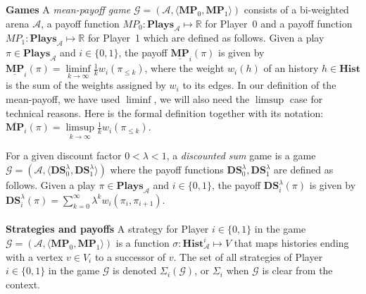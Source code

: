 \noindent\textbf{Games} A \textit{mean-payoff game} $\mathcal{G} = (\mathcal{A},\langle \mathbf{MP}_0, \mathbf{MP}_1\rangle)$ consists of a bi-weighted arena $\mathcal{A}$, a payoff function $MP_0 : \mathbf{Plays}_{\mathcal{A}} \mapsto \mathbb{R}$ for Player~0 and a payoff function $MP_1 : \mathbf{Plays}_{\mathcal{A}} \mapsto \mathbb{R}$ for Player~1 which are defined as follows. Given a play $\pi \in \mathbf{Plays}_{\mathcal{A}}$ and $i \in \{0,1\}$, the payoff $\underline{\mathbf{MP}}_i(\pi)$ is given by $\underline{\mathbf{MP}}_i(\pi) = \liminf\limits_{k \to \infty} \frac{1}{k}w_i(\pi_{\leqslant k}) $, where the weight $w_i(h)$ of an history $h \in \mathbf{Hist}$ is the sum of the weights assigned by $w_i$ to its edges. In our definition of the mean-payoff, we have used $\liminf$, we will also need the $\limsup$ case for technical reasons. Here is the formal definition together with its notation: $\overline{\mathbf{MP}}_i(\pi) = \limsup\limits_{k \to \infty} \frac{1}{k}w_i(\pi_{\leqslant k}) $.

For a given discount factor $0 < \lambda < 1$, a \textit{discounted sum} game is a game $\mathcal{G} = (\mathcal{A},\langle \mathbf{DS}^{\lambda}_0, \mathbf{DS}^{\lambda}_1\rangle)$ where the payoff functions $\mathbf{DS}^{\lambda}_0, \mathbf{DS}^{\lambda}_1$ are defined as follows. Given a play $\pi \in \mathbf{Plays}_{\mathcal{A}}$ and $i \in \{0,1\}$, the payoff $\mathbf{DS}^{\lambda}_i(\pi)$ is given by $\mathbf{DS}^{\lambda}_i(\pi) = \sum^{\infty}_{k=0}\lambda^k w_i(\pi_i, \pi_{i+1})$.
\\
\\
\textbf{Strategies and payoffs} A strategy for Player $i \in \{0,1\}$ in the game $\mathcal{G} = (\mathcal{A},\langle \mathbf{MP}_0, \mathbf{MP}_1\rangle)$ is a function $\sigma: \mathbf{Hist}^i_{\mathcal{A}} \mapsto V$ that maps histories ending with a vertex $v \in V_i$ to a successor of $v$. The set of all strategies of Player $i \in \{0,1\}$ in the game $\mathcal{G}$ is denoted $\Sigma_i(\mathcal{G})$, or $\Sigma_i$ when $\mathcal{G}$ is clear from the context.

